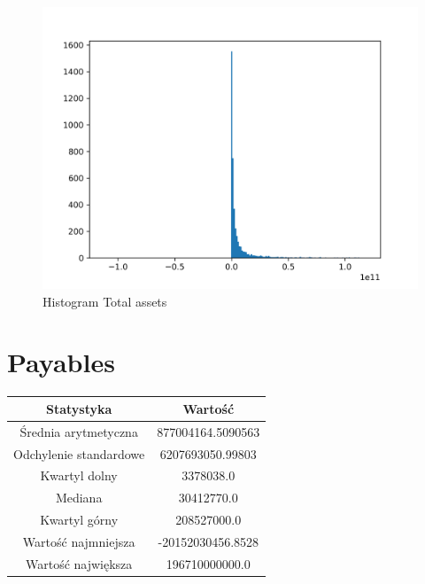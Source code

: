 \documentclass{article}
\begin{document}
\begin{figure}[h!]
    \includegraphics[width=\linewidth]{variables/Total assets.png}
    \caption{Histogram Total assets }
\end{figure}\section{ Payables }

\begin{center}
    \begin{tabular}{|c | c|} 
    \hline
    Statystyka & Wartość \\
    \hline\hline
    Średnia arytmetyczna & 877004164.5090563 \\ 
    \hline
    Odchylenie standardowe & 6207693050.99803 \\
    \hline
    Kwartyl dolny & 3378038.0 \\
    \hline
    Mediana & 30412770.0 \\
    \hline
    Kwartyl górny & 208527000.0 \\
    \hline
    Wartość najmniejsza & -20152030456.8528 \\
    \hline
    Wartość największa & 196710000000.0 \\
    \hline
   \end{tabular}
\end{center}
\end{document}
